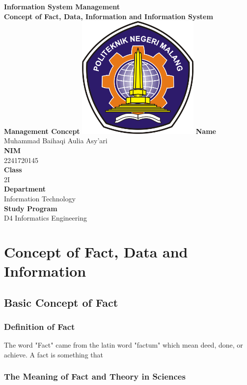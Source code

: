 \documentclass[12pt,titlepage]{article}
\newcommand{\vSubject}{Information System Management}
\newcommand{\vSubtitle}{Concept of Fact, Data, Information and Information System Management Concept}
\newcommand{\vName}{Muhammad Baihaqi Aulia Asy'ari}
\newcommand{\vNIM}{2241720145}
\newcommand{\vClass}{2I}
\newcommand{\vDepartment}{Information Technology}
\newcommand{\vStudyProgram}{D4 Informatics Engineering}
\begin{document}
\begin{titlepage}
    \centering
    \vfill
    {\bfseries\LARGE
        \vSubject\\
        \vskip0.25cm
        \vSubtitle
    }
    \vfill
    \includegraphics[width=6cm]{images/polinema-logo.png}
    \vfill
    {
        \textbf{Name}\\
        \vName\\
        \vskip0.5cm
        \textbf{NIM}\\
        \vNIM\\
        \vskip0.5cm
        \textbf{Class}\\
        \vClass\\
        \vskip0.5cm
        \textbf{Department}\\
        \vDepartment\\
        \vskip0.5cm
        \textbf{Study Program}\\
        \vStudyProgram
    }
\end{titlepage}

\newpage

\tableofcontents

\newpage

\section{Concept of Fact, Data and Information}

\subsection{Basic Concept of Fact}
\subsubsection{Definition of Fact}
The word "Fact" came from the latin word "factum" which mean deed, done, or achieve. A fact is something that 
\subsubsection{The Meaning of Fact and Theory in Sciences}
\end{document}
